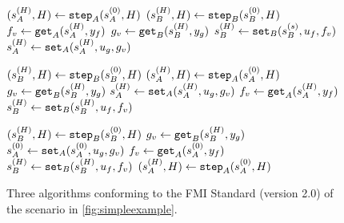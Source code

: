 \begin{figure}[htb]
  \centering
  \begin{minipage}[t]{.325\textwidth}
    \begin{algorithm}[H]
      \caption{}
      \label{alg:algorithm_1}
      \begin{algorithmic}[1]
        \scriptsize
        \State $(s_{A}^{(H)},H) \gets \mathtt{step}_{A}(s_{A}^{(0)}, H)$
        \State $(s_{B}^{(H)},H) \gets \mathtt{step}_{B}(s_{B}^{(0)}, H)$
        \State $f_{v} \gets \mathtt{get}_{A}(s_{A}^{(H)}, y_{f})$
        \State $g_{v} \gets \mathtt{get}_{B}(s_{B}^{(H)}, y_{g})$
        \State $s_{B}^{(H)} \gets \mathtt{set}_{B}(s_{B}^{(s)}, u_{f}, f_{v})$
        \State $s_{A}^{(H)} \gets \mathtt{set}_{A}(s_{A}^{(H)},u_{g},g_{v})$
      \end{algorithmic}
    \end{algorithm}
  \end{minipage}
  \begin{minipage}[t]{0.325\textwidth}
    \begin{algorithm}[H]
      \caption{}
      \label{alg:algorithm_2}
      \begin{algorithmic}[1]
        \scriptsize
        \State $(s_{B}^{(H)},H) \gets \mathtt{step}_{B}(s_{B}^{(0)}, H)$
        \State $(s_{A}^{(H)},H) \gets \mathtt{step}_{A}(s_{A}^{(0)}, H)$
        \State $g_v \gets \mathtt{get}_{B}(s_{B}^{(H)}, y_{g})$
        \State $s_{A}^{(H)} \gets \mathtt{set}_{A}(s_{A}^{(H)}, u_{g}, g_v)$
        \State $f_v \gets \mathtt{get}_{A}(s_{A}^{(H)}, y_{f})$
        \State $s_{B}^{(H)} \gets \mathtt{set}_{B}(s_{B}^{(H)}, u_{f}, f_v)$
      \end{algorithmic}
    \end{algorithm}
  \end{minipage}
  \begin{minipage}[t]{0.325\textwidth}
    \begin{algorithm}[H]
      \caption{}
      \label{alg:algorithm_3}
      \begin{algorithmic}[1]
        \scriptsize
        \State $(s_{B}^{(H)},H) \gets \mathtt{step}_{B}(s_{B}^{(0)}, H)$
        \State $g_v \gets \mathtt{get}_{B}(s_{B}^{(H)}, y_{g})$
        \State $s_{A}^{(0)} \gets \mathtt{set}_{A}(s_{A}^{(0)}, u_{g}, g_v)$
        \State $f_v \gets \mathtt{get}_{A}(s_{A}^{(0)}, y_{f})$
        \State $s_{B}^{(H)} \gets \mathtt{set}_{B}(s_{B}^{(H)}, u_{f}, f_v)$
        \State $(s_{A}^{(H)},H) \gets \mathtt{step}_{A}(s_{A}^{(0)}, H)$
      \end{algorithmic}
    \end{algorithm}
    \vspace{4pt}
  \end{minipage}
  \vspace{-2em}
  \caption{Three algorithms conforming to the FMI Standard (version 2.0) of the scenario in \cref{fig:simpleexample}.}
  \label{fig:algorithms}
\end{figure}

